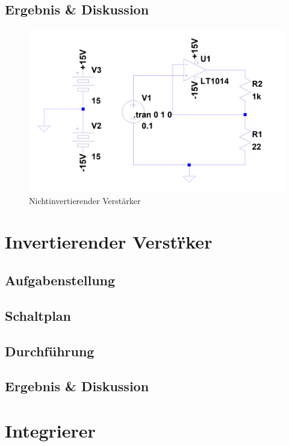 \documentclass[12pt,a4paper,titlepage]{article}
\begin{document}
\subsection{Ergebnis \& Diskussion}
\begin{figure}
  \includegraphics{nichtinvertierend_schaltung}
  \caption{Nichtinvertierender Verst\"arker}
\end{figure}



\section{Invertierender Verst\"rker}

\subsection{Aufgabenstellung}

\subsection{Schaltplan}

\subsection{Durchf\"uhrung}

\subsection{Ergebnis \& Diskussion}

\section{Integrierer}
\end{document}
